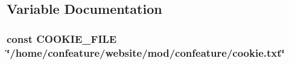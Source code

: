 \subsection{Variable Documentation}
\hypertarget{locallib_8php_a30f006ca5997500742610df15bccc1a2}{
\subsubsection[{C\-O\-O\-K\-I\-E\-\_\-\-F\-I\-L\-E}]{\setlength{\rightskip}{0pt plus 5cm}const C\-O\-O\-K\-I\-E\-\_\-\-F\-I\-L\-E \char`\"{}/home/confeature/website/mod/confeature/cookie.\-txt\char`\"{}}}\label{locallib_8php_a30f006ca5997500742610df15bccc1a2}
